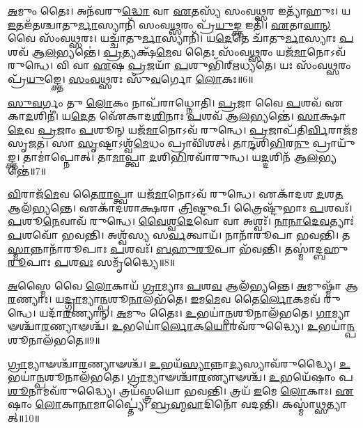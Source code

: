 \-\ul{𑌅}\-𑌮𑍁𑌂 𑌤𑍈𑌃।
𑌅𑌨᳴𑌵𑌰𑍁\-\ul{𑌦𑍍𑌧𑍋} 𑌵𑌾 \ul{𑌏}\-𑌤𑌸𑍍𑌯᳴ 𑌸𑌂𑌵\-\ul{𑌥𑍍𑌸}\-𑌰 𑌇𑌤𑍍𑌯𑌾᳴𑌹𑍁𑌃।
𑌯 \ul{𑌇}\-𑌤𑌇᳴𑌤𑌶𑍍𑌚𑌾𑌤𑍁\-\ul{𑌰𑍍𑌮𑌾}\-𑌸𑍍𑌯𑌾𑌨𑌿᳴ 𑌸𑌂𑌵\-\ul{𑌥𑍍𑌸}\-𑌰𑌂 𑌪𑍍𑌰᳴\-\ul{𑌯𑍁}\-𑌙𑍍𑌕𑍍𑌤 𑌇𑌤𑌿᳴।
\-\ul{𑌏}\-𑌤𑌾\-\ul{𑌵𑌾}\-\-\ul{𑌨𑍍} 𑌵𑍈 𑌸𑌂᳴𑌵\-\ul{𑌥𑍍𑌸}\-𑌰𑌃।
𑌯𑌚𑍍𑌚𑌾᳴𑌤𑍁\-\ul{𑌰𑍍𑌮𑌾}\-𑌸𑍍𑌯𑌾𑌨𑌿᳴।
𑌯\-\ul{𑌦𑍇}\-𑌤𑍇 𑌚𑌾᳴𑌤𑍁\-\ul{𑌰𑍍𑌮𑌾}\-𑌸𑍍𑌯𑌾𑌃 \ul{𑌪}\-𑌶𑌵᳴ 𑌆\-\ul{𑌲}\-𑌭𑍍𑌯𑌨𑍍𑌤𑍇॑।
\-\ul{𑌪𑍍𑌰}\-𑌤𑍍𑌯𑌕𑍍𑌷᳴\-\ul{𑌮𑍇}\-𑌵 𑌤𑍈𑌃 𑌸𑌂᳴𑌵\-\ul{𑌥𑍍𑌸}\-𑌰𑌂 𑌯𑌜᳴\-\ul{𑌮𑌾}\-𑌨𑍋\-𑌽𑌵᳴ 𑌰𑍁𑌨𑍍𑌧𑍇।
𑌵𑌿 𑌵𑌾 \ul{𑌏}\-𑌷 \ul{𑌪𑍍𑌰}\-𑌜𑌯𑌾᳴ \ul{𑌪}\-𑌶𑍁𑌭𑌿᳴𑌰𑍍‌\mbox{}𑌋𑌧𑍍𑌯𑌤𑍇।
𑌯𑌃 𑌸𑌂᳴𑌵\-\ul{𑌥𑍍𑌸}\-𑌰𑌂 𑌪𑍍𑌰᳴\-\ul{𑌯𑍁}\-𑌙𑍍𑌕𑍍𑌤𑍇।
\-\ul{𑌸𑌂}\-\-\ul{𑌵}\-\-\ul{𑌥𑍍𑌸}\-𑌰𑌃 𑌸𑍁᳴\-\ul{𑌵}\-𑌰𑍍𑌗𑍋 \ul{𑌲𑍋}\-𑌕𑌃॥6॥

\-\ul{𑌸𑍁}\-\-\ul{𑌵}\-𑌰𑍍𑌗𑌂 𑌤𑍁 \ul{𑌲𑍋}\-𑌕𑌂 𑌨𑌾𑌪᳴𑌰𑌾𑌧𑍍𑌨𑍋𑌤𑌿।
\-\ul{𑌪𑍍𑌰}\-𑌜𑌾 𑌵𑍈 \ul{𑌪}\-𑌶𑌵᳴ 𑌏𑌕𑌾\-\ul{𑌦}\-𑌶𑌿𑌨𑍀॑।
𑌯\-\ul{𑌦𑍇}\-𑌤 𑌐᳴𑌕𑌾𑌦\-\ul{𑌶𑌿}\-𑌨𑌾𑌃 \ul{𑌪}\-𑌶𑌵᳴ 𑌆\-\ul{𑌲}\-𑌭𑍍𑌯𑌨𑍍𑌤𑍇॑।
\-\ul{𑌸𑌾}\-𑌕𑍍𑌷𑌾\-\ul{𑌦𑍇}\-𑌵 \ul{𑌪𑍍𑌰}\-𑌜𑌾𑌂 \ul{𑌪}\-𑌶𑍂𑌨𑍍 𑌯𑌜᳴\-\ul{𑌮𑌾}\-𑌨𑍋\-𑌽𑌵᳴ 𑌰𑍁𑌨𑍍𑌧𑍇।
\-\ul{𑌪𑍍𑌰}\-𑌜𑌾𑌪᳴𑌤𑌿\-\ul{𑌰𑍍𑌵𑌿}\-𑌰𑌾𑌜᳴𑌮\-𑌸𑍃𑌜𑌤।
𑌸𑌾 \ul{𑌸𑍃}\-𑌷𑍍𑌟𑌾\-𑌽𑌶𑍍𑌵᳴\-\ul{𑌮𑍇}\-𑌧𑌂 𑌪𑍍𑌰𑌾𑌵𑌿᳴𑌶𑌤𑍍।
𑌤𑌾\-\ul{𑌨𑍍𑌦}\-𑌶𑌿\-\ul{𑌭𑌿}\-𑌰\-\ul{𑌨𑍁}\- 𑌪𑍍𑌰𑌾𑌯𑍁᳴𑌙𑍍𑌕𑍍𑌤।
𑌤𑌾𑌮𑌾॑𑌪𑍍𑌨𑍋𑌤𑍍।
𑌤𑌾\-\ul{𑌮𑌾}\-𑌪𑍍𑌤𑍍𑌵𑌾 \ul{𑌦}\-𑌶𑌿\-\ul{𑌭𑌿}\-𑌰𑌵𑌾᳴𑌰𑍁𑌨𑍍𑌧।
𑌯\-\ul{𑌦𑍍𑌦}\-𑌶𑌿𑌨᳴ 𑌆\-\ul{𑌲}\-𑌭𑍍𑌯𑌨𑍍𑌤𑍇॑॥7॥

\-\ul{𑌵𑌿}\-𑌰𑌾𑌜᳴\-\ul{𑌮𑍇}\-𑌵 𑌤𑍈\-\ul{𑌰𑌾}\-𑌪𑍍𑌤𑍍𑌵𑌾 𑌯𑌜᳴\-\ul{𑌮𑌾}\-𑌨𑍋\-𑌽𑌵᳴ 𑌰𑍁𑌨𑍍𑌧𑍇।
𑌏𑌕𑌾᳴𑌦𑌶 \ul{𑌦}\-𑌶\-\ul{𑌤} 𑌆𑌲᳴𑌭𑍍𑌯𑌨𑍍𑌤𑍇।
𑌏𑌕𑌾᳴𑌦𑌶𑌾𑌕𑍍𑌷𑌰𑌾 \ul{𑌤𑍍𑌰𑌿}\-𑌷𑍍𑌟𑍁𑌪𑍍।
𑌤𑍍𑌰𑍈𑌷𑍍𑌟𑍁᳴𑌭𑌾𑌃 \ul{𑌪}\-𑌶𑌵𑌃᳴।
\-\ul{𑌪}\-𑌶𑍂\-\ul{𑌨𑍇}\-𑌵𑌾𑌵᳴ 𑌰𑍁𑌨𑍍𑌧𑍇।
\-\ul{𑌵𑍈}\-\-\ul{𑌶𑍍𑌵}\-\-\ul{𑌦𑍇}\-𑌵𑍋 𑌵𑌾 𑌅𑌶𑍍𑌵𑌃᳴।
\-\ul{𑌨𑌾}\-\-\ul{𑌨𑌾}\-\-\ul{𑌦𑍇}\-\-\ul{𑌵}\-𑌤𑍍𑌯𑌾𑌃॑ \ul{𑌪}\-𑌶𑌵𑍋᳴ 𑌭𑌵𑌨𑍍𑌤𑌿।
𑌅𑌶𑍍𑌵᳴𑌸𑍍𑌯 𑌸\-\ul{𑌰𑍍𑌵}\-𑌤𑍍𑌵𑌾𑌯᳴।
𑌨𑌾𑌨𑌾᳴𑌰𑍂𑌪𑌾 𑌭𑌵𑌨𑍍𑌤𑌿।
𑌤\-\ul{𑌸𑍍𑌮𑌾}\-𑌨𑍍𑌨𑌾𑌨𑌾᳴𑌰𑍂𑌪𑌾𑌃 \ul{𑌪}\-𑌶𑌵𑌃᳴।
\-\ul{𑌬}\-\-\ul{𑌹𑍁}\-\-\ul{𑌰𑍂}\-𑌪𑌾 𑌭᳴𑌵𑌨𑍍𑌤𑌿।
𑌤𑌸𑍍𑌮𑌾॑𑌦𑍍𑌬𑌹𑍁\-\ul{𑌰𑍂}\-𑌪𑌾𑌃 \ul{𑌪}\-𑌶\-\ul{𑌵𑌃} 𑌸𑌮𑍃᳴𑌦𑍍𑌧𑍍𑌯𑍈॥8॥\anuvakamend[\-\ul{𑌆}\-\-\ul{𑌰}\-𑌣𑍍𑌯𑌾𑌁\-\ul{𑌲𑍍𑌲𑍋}\-𑌕𑍋 \ul{𑌦}\-𑌶𑌿𑌨᳴ 𑌆\-\ul{𑌲}\-𑌭𑍍𑌯\-\ul{𑌨𑍍𑌤𑍇} 𑌨𑌾𑌨𑌾᳴𑌰𑍂𑌪𑌾𑌃 \ul{𑌪}\-𑌶\-\ul{𑌵𑍋} 𑌦𑍍𑌵𑍇 𑌚᳴]

\-\ul{𑌅}\-𑌸𑍍𑌮𑍈 𑌵𑍈 \ul{𑌲𑍋}\-𑌕𑌾𑌯᳴ \ul{𑌗𑍍𑌰𑌾}\-𑌮𑍍𑌯𑌾𑌃 \ul{𑌪}\-𑌶\-\ul{𑌵} 𑌆𑌲᳴𑌭𑍍𑌯𑌨𑍍𑌤𑍇।
\-\ul{𑌅}\-𑌮𑍁𑌷𑍍𑌮𑌾᳴ 𑌆\-\ul{𑌰}\-𑌣𑍍𑌯𑌾𑌃।
𑌯\-\ul{𑌦𑍍𑌗𑍍𑌰𑌾}\-𑌮𑍍𑌯𑌾\-\ul{𑌨𑍍𑌪}\-𑌶𑍂\-\ul{𑌨𑌾}\-𑌲𑌭᳴𑌤𑍇।
\-\ul{𑌇}\-𑌮\-\ul{𑌮𑍇}\-𑌵 𑌤𑍈\-\ul{𑌰𑍍𑌲𑍋}\-𑌕𑌮𑌵᳴ 𑌰𑍁𑌨𑍍𑌧𑍇।
𑌯𑌦𑌾᳴\-\ul{𑌰}\-𑌣𑍍𑌯𑌾𑌨𑍍।
\-\ul{𑌅}\-𑌮𑍁𑌂 𑌤𑍈𑌃।
\-\ul{𑌉}\-𑌭𑌯𑌾॑\-\ul{𑌨𑍍𑌪}\-𑌶𑍂𑌨𑌾𑌲᳴𑌭𑌤𑍇।
\-\ul{𑌗𑌾}\-𑌮𑍍𑌯𑌾𑍟𑌶𑍍𑌚𑌾᳴\-\ul{𑌰}\-𑌣𑍍𑌯𑌾𑍟𑌶𑍍𑌚᳴।
\-\ul{𑌉}\-𑌭𑌯𑍋॑\-\ul{𑌰𑍍𑌲𑍋}\-𑌕\-\ul{𑌯𑍋}\-𑌰𑌵᳴𑌰𑍁𑌦𑍍𑌧𑍍𑌯𑍈।
\-\ul{𑌉}\-𑌭𑌯𑌾॑\-\ul{𑌨𑍍𑌪}\-𑌶𑍂𑌨𑌾\-𑌲᳴𑌭𑌤𑍇॥9॥

\-\ul{𑌗𑍍𑌰𑌾}\-𑌮𑍍𑌯𑌾𑍟𑌶𑍍𑌚𑌾᳴\-\ul{𑌰}\-𑌣𑍍𑌯𑌾𑍟𑌶𑍍𑌚᳴।
\-\ul{𑌉}\-𑌭𑌯᳴\-\ul{𑌸𑍍𑌯𑌾}\-𑌨𑍍𑌨𑌾\-\ul{𑌦𑍍𑌯}\-𑌸𑍍𑌯𑌾𑌵᳴𑌰𑍁𑌦𑍍𑌧𑍍𑌯𑍈।
\-\ul{𑌉}\-𑌭𑌯𑌾॑\-\ul{𑌨𑍍𑌪}\-𑌶𑍂\-𑌨𑌾𑌲᳴𑌭𑌤𑍇।
\-\ul{𑌗𑍍𑌰𑌾}\-𑌮𑍍𑌯𑌾𑍟𑌶𑍍𑌚𑌾᳴\-\ul{𑌰}\-𑌣𑍍𑌯𑌾𑍟𑌶𑍍𑌚᳴।
\-\ul{𑌉}\-𑌭𑌯𑍇᳴𑌷𑌾𑌂 𑌪\-\ul{𑌶𑍂}\-𑌨𑌾𑌮𑌵᳴𑌰𑍁𑌦𑍍𑌧𑍍𑌯𑍈।
𑌤𑍍𑌰𑌯᳴𑌸𑍍𑌤𑍍𑌰𑌯𑍋 𑌭𑌵𑌨𑍍𑌤𑌿।
𑌤𑍍𑌰𑌯᳴ \ul{𑌇}\-𑌮𑍇 \ul{𑌲𑍋}\-𑌕𑌾𑌃।
\-\ul{𑌏}\-𑌷𑌾𑌂 \ul{𑌲𑍋}\-𑌕𑌾\-\ul{𑌨𑌾}\-𑌮𑌾𑌪𑍍𑌤𑍍𑌯𑍈॑।
\-\ul{𑌬𑍍𑌰}\-\-\ul{𑌹𑍍𑌮}\-\-\ul{𑌵𑌾}\-𑌦𑌿𑌨𑍋᳴ 𑌵𑌦𑌨𑍍𑌤𑌿।
𑌕𑌸𑍍𑌮𑌾॑\-\ul{𑌥𑍍𑌸}\-𑌤𑍍𑌯𑌾𑌤𑍍॥10॥

